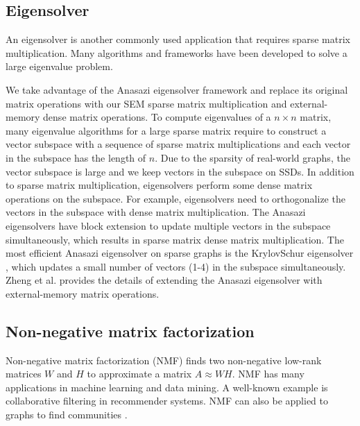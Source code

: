 \subsection{Eigensolver}
An eigensolver is another commonly used application that requires sparse matrix
multiplication. Many algorithms \cite{Lanczos, IRLM, krylovschur} and frameworks
\cite{arpack, anasazi, slepc} have been developed to solve a large eigenvalue
problem.

We take advantage of the Anasazi eigensolver framework \cite{anasazi} and
replace its original matrix operations with our SEM sparse
matrix multiplication and external-memory dense matrix operations. To compute
eigenvalues of a $n \times n$ matrix, many eigenvalue algorithms for a large
sparse matrix require to construct a vector subspace with a sequence of
sparse matrix multiplications and each vector in the subspace has the length of $n$.
Due to the sparsity of real-world graphs, the vector subspace is large and we keep
vectors in the subspace on SSDs. In addition to sparse matrix
multiplication, eigensolvers perform some dense matrix operations on the subspace.
For example, eigensolvers need to orthogonalize the vectors in the subspace with
dense matrix multiplication. The Anasazi eigensolvers have block extension to
update multiple vectors in the subspace simultaneously, which results in sparse matrix dense
matrix multiplication. The most efficient Anasazi eigensolver on sparse graphs
is the KrylovSchur eigensolver \cite{krylovschur}, which updates a small number
of vectors (1-4) in the subspace simultaneously. Zheng et al.
\cite{flasheigen} provides the details of extending the Anasazi eigensolver
with external-memory matrix operations.


\subsection{Non-negative matrix factorization}
Non-negative matrix factorization (NMF) \cite{nmf} finds two non-negative
low-rank matrices $W$ and $H$ to approximate a matrix $A \approx WH$. NMF
has many applications in machine learning
and data mining. A well-known example is collaborative filtering \cite{cf} in
recommender systems. NMF can also be applied to graphs to find communities
\cite{yang13, wang11}.


